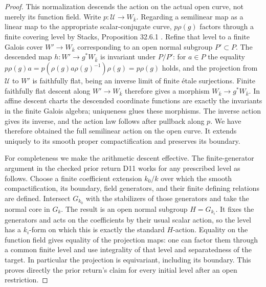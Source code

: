 \begin{proof}
This normalization descends the action on the actual open
curve, not merely its function field. Write
$p:\mathcal U\to W_{\bar k}$. Regarding a semilinear map as
a linear map to the appropriate scalar-conjugate curve,
$p\rho(g)$ factors through a finite covering level by
Stacks, Proposition 32.6.1 \cite{CF_StacksLimits}.
Refine that level to a finite Galois cover $W'\to W_{\bar k}$
corresponding to an open normal subgroup $P'\subset P$.
The descended map $h:W'\to g^*W_{\bar k}$ is invariant
under $P/P'$: for $a\in P$ the equality
$p\rho(g)a=p(\rho(g)a\rho(g)^{-1})\rho(g)=p\rho(g)$
holds, and the projection from $\mathcal U$ to $W'$ is
faithfully flat, being an inverse limit of finite \'etale
surjections.
Finite faithfully flat descent along $W'\to W_{\bar k}$
therefore gives a morphism $W_{\bar k}\to g^*W_{\bar k}$.
In affine descent charts the descended coordinate functions
are exactly the invariants in the finite Galois algebra;
uniqueness glues these morphisms. The inverse action gives
its inverse, and the action law follows after pullback along
$p$. We have therefore obtained the full semilinear action
on the open curve. It extends uniquely to its smooth proper
compactification and preserves its boundary.

For completeness we make the arithmetic descent effective.
The finite-generator argument in the checked prior return D11
\cite{PriorCyclotomic} works for any prescribed level as follows.
Choose a finite coefficient extension $k_0/k$ over which the
smooth compactification, its boundary, field generators, and
their finite defining relations are defined. Intersect
$G_{k_0}$ with the stabilizers of those generators and take
the normal core in $G_k$. The result is an open normal subgroup
$H=G_{k_i}$. It fixes the generators and acts on the coefficients
by their usual scalar action, so the level has a $k_i$-form
on which this is exactly the standard $H$-action. Equality on
the function field gives equality of the projection maps:
one can factor them through a common finite level and use
integrality of that level and separatedness of the target.
In particular the projection is equivariant, including its
boundary. This proves directly the prior return's claim for
every initial level after an open restriction.


\end{proof}

